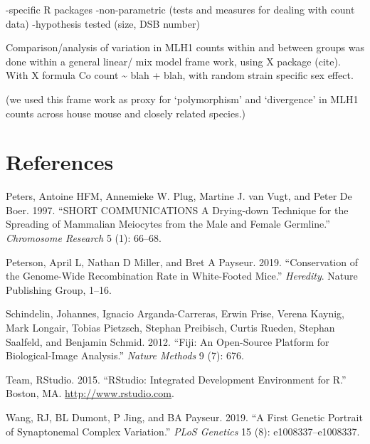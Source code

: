 \documentclass[]{article}
\begin{document}
-specific R packages -non-parametric (tests and measures for dealing
with count data) -hypothesis tested (size, DSB number)

Comparison/analysis of variation in MLH1 counts within and between
groups was done within a general linear/ mix model frame work, using X
package (cite). With X formula Co count \textasciitilde{} blah + blah,
with random strain specific sex effect.

(we used this frame work as proxy for `polymorphism' and `divergence' in
MLH1 counts across house mouse and closely related species.)

\section*{References}\label{references}

\hypertarget{refs}{}
\hypertarget{ref-peters_1997}{}
Peters, Antoine HFM, Annemieke W. Plug, Martine J. van Vugt, and Peter
De Boer. 1997. ``SHORT COMMUNICATIONS A Drying-down Technique for the
Spreading of Mammalian Meiocytes from the Male and Female Germline.''
\emph{Chromosome Research} 5 (1): 66--68.

\hypertarget{ref-peterson_2019}{}
Peterson, April L, Nathan D Miller, and Bret A Payseur. 2019.
``Conservation of the Genome-Wide Recombination Rate in White-Footed
Mice.'' \emph{Heredity}. Nature Publishing Group, 1--16.

\hypertarget{ref-fiji}{}
Schindelin, Johannes, Ignacio Arganda-Carreras, Erwin Frise, Verena
Kaynig, Mark Longair, Tobias Pietzsch, Stephan Preibisch, Curtis Rueden,
Stephan Saalfeld, and Benjamin Schmid. 2012. ``Fiji: An Open-Source
Platform for Biological-Image Analysis.'' \emph{Nature Methods} 9 (7):
676.

\hypertarget{ref-Rstudio}{}
Team, RStudio. 2015. ``RStudio: Integrated Development Environment for
R.'' Boston, MA. \url{http://www.rstudio.com}.

\hypertarget{ref-wang_2019_sc}{}
Wang, RJ, BL Dumont, P Jing, and BA Payseur. 2019. ``A First Genetic
Portrait of Synaptonemal Complex Variation.'' \emph{PLoS Genetics} 15
(8): e1008337--e1008337.
\end{document}
